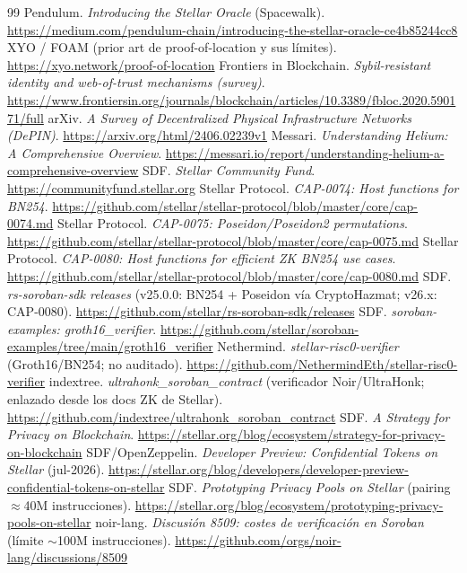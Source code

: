 \documentclass[twocolumn,10pt]{article}
\begin{document}
\begin{thebibliography}{99}
 Pendulum. \emph{Introducing the Stellar Oracle} (Spacewalk). \url{https://medium.com/pendulum-chain/introducing-the-stellar-oracle-ce4b85244cc8}
 XYO / FOAM (prior art de proof-of-location y sus l\'imites). \url{https://xyo.network/proof-of-location}
 Frontiers in Blockchain. \emph{Sybil-resistant identity and web-of-trust mechanisms (survey)}. \url{https://www.frontiersin.org/journals/blockchain/articles/10.3389/fbloc.2020.590171/full}
 arXiv. \emph{A Survey of Decentralized Physical Infrastructure Networks (DePIN)}. \url{https://arxiv.org/html/2406.02239v1}
 Messari. \emph{Understanding Helium: A Comprehensive Overview}. \url{https://messari.io/report/understanding-helium-a-comprehensive-overview}
 SDF. \emph{Stellar Community Fund}. \url{https://communityfund.stellar.org}
 Stellar Protocol. \emph{CAP-0074: Host functions for BN254}. \url{https://github.com/stellar/stellar-protocol/blob/master/core/cap-0074.md}
 Stellar Protocol. \emph{CAP-0075: Poseidon/Poseidon2 permutations}. \url{https://github.com/stellar/stellar-protocol/blob/master/core/cap-0075.md}
 Stellar Protocol. \emph{CAP-0080: Host functions for efficient ZK BN254 use cases}. \url{https://github.com/stellar/stellar-protocol/blob/master/core/cap-0080.md}
 SDF. \emph{rs-soroban-sdk releases} (v25.0.0: BN254 + Poseidon v\'ia CryptoHazmat; v26.x: CAP-0080). \url{https://github.com/stellar/rs-soroban-sdk/releases}
 SDF. \emph{soroban-examples: groth16\_verifier}. \url{https://github.com/stellar/soroban-examples/tree/main/groth16_verifier}
 Nethermind. \emph{stellar-risc0-verifier} (Groth16/BN254; no auditado). \url{https://github.com/NethermindEth/stellar-risc0-verifier}
 indextree. \emph{ultrahonk\_soroban\_contract} (verificador Noir/UltraHonk; enlazado desde los docs ZK de Stellar). \url{https://github.com/indextree/ultrahonk_soroban_contract}
 SDF. \emph{A Strategy for Privacy on Blockchain}. \url{https://stellar.org/blog/ecosystem/strategy-for-privacy-on-blockchain}
 SDF/OpenZeppelin. \emph{Developer Preview: Confidential Tokens on Stellar} (jul-2026). \url{https://stellar.org/blog/developers/developer-preview-confidential-tokens-on-stellar}
 SDF. \emph{Prototyping Privacy Pools on Stellar} (pairing $\approx$40M instrucciones). \url{https://stellar.org/blog/ecosystem/prototyping-privacy-pools-on-stellar}
 noir-lang. \emph{Discusi\'on 8509: costes de verificaci\'on en Soroban} (l\'imite $\sim$100M instrucciones). \url{https://github.com/orgs/noir-lang/discussions/8509}

\end{thebibliography}
\end{document}
